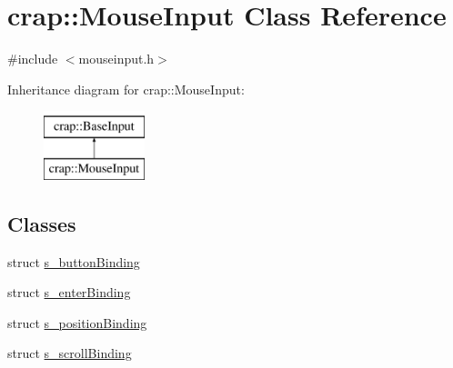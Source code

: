 \hypertarget{classcrap_1_1_mouse_input}{}\section{crap\+:\+:Mouse\+Input Class Reference}
\label{classcrap_1_1_mouse_input}


{\ttfamily \#include $<$mouseinput.\+h$>$}

Inheritance diagram for crap\+:\+:Mouse\+Input\+:\begin{figure}[H]
\begin{center}
\leavevmode
\includegraphics[height=2.000000cm]{classcrap_1_1_mouse_input}
\end{center}
\end{figure}
\subsection*{Classes}
\begin{DoxyCompactItemize}
\item 
struct \hyperlink{structcrap_1_1_mouse_input_1_1s__button_binding}{s\+\_\+button\+Binding}
\item 
struct \hyperlink{structcrap_1_1_mouse_input_1_1s__enter_binding}{s\+\_\+enter\+Binding}
\item 
struct \hyperlink{structcrap_1_1_mouse_input_1_1s__position_binding}{s\+\_\+position\+Binding}
\item 
struct \hyperlink{structcrap_1_1_mouse_input_1_1s__scroll_binding}{s\+\_\+scroll\+Binding}
\end{DoxyCompactItemize}
